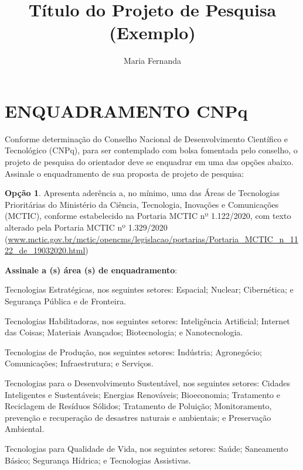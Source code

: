 \documentclass[12pt, consuni, professor]{uftpibic}
\title{Título do Projeto de Pesquisa (Exemplo)}
\author{Maria Fernanda}{Souza}
\newcommand{\ok}{\makebox[0pt][l]{(\ \ \ )}\raisebox{.15ex}{\hspace{0.1em}\color{blue}{ $\checkmark\quad$}}}
\newcommand{\ko}{\makebox[0pt][l]{(\ \ \ )}\raisebox{.15ex}{\hspace{0.1em}$\qquad$}}
\theoremstyle{plain}
\begin{document}
\maketitle

\vspace{1cm}
\chapter{ENQUADRAMENTO CNP\lowercase{q}}

\onehalfspace
Conforme determinação do Conselho Nacional de Desenvolvimento Científico e Tecnológico (CNPq), para ser contemplado com bolsa fomentada pelo conselho, o projeto de pesquisa do orientador deve se enquadrar em uma das opções abaixo. Assinale o enquadramento de sua proposta de projeto de pesquisa:

\bigbreak

\ok \textbf{Opção 1}. Apresenta aderência a, no mínimo, uma das Áreas de Tecnologias Prioritárias do Ministério da Ciência, Tecnologia, Inovações e Comunicações (MCTIC), conforme estabelecido na Portaria MCTIC nº 1.122/2020, com texto alterado pela Portaria MCTIC nº 1.329/2020 (\url{www.mctic.gov.br/mctic/opencms/legislacao/portarias/Portaria_MCTIC_n_1122_de_19032020.html})

\bigbreak

\textbf{Assinale a (s) área (s) de enquadramento}:

\bigbreak

\ok  Tecnologias Estratégicas, nos seguintes setores: Espacial; Nuclear; Cibernética; e Segurança Pública e de Fronteira.

\ok Tecnologias Habilitadoras, nos seguintes setores: Inteligência Artificial; Internet das Coisas; Materiais Avançados; Biotecnologia; e Nanotecnologia.

\ko Tecnologias de Produção, nos seguintes setores: Indústria; Agronegócio; Comunicações; Infraestrutura; e Serviços.

\ko Tecnologias para o Desenvolvimento Sustentável, nos seguintes setores: Cidades Inteligentes e Sustentáveis; Energias Renováveis; Bioeconomia; Tratamento e Reciclagem de Resíduos Sólidos; Tratamento de Poluição; Monitoramento, prevenção e recuperação de desastres naturais e ambientais; e Preservação Ambiental.

\ko Tecnologias para Qualidade de Vida, nos seguintes setores: Saúde; Saneamento Básico; Segurança Hídrica; e Tecnologias Assistivas.

\bigbreak
\end{document}
